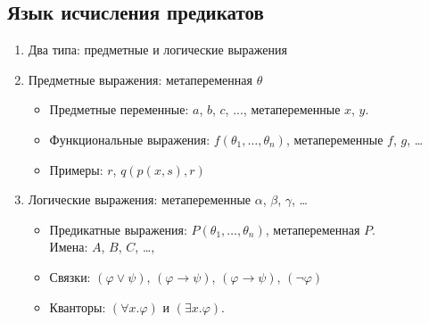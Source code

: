 \subsection{Язык исчисления предикатов}
\begin{enumerate}
    \item Два типа: предметные и логические выражения
    \item Предметные выражения: метапеременная {\color{blue}$\theta$}
    \begin{itemize}
        \item Предметные переменные: {\color{blue}$a$}, {\color{blue}$b$}, {\color{blue}$c$}, ..., метапеременные {\color{blue}$x$}, {\color{blue}$y$}.
        \item Функциональные выражения: {\color{blue}$f(\theta_1,\dots,\theta_n)$}, метапеременные {\color{blue}$f$}, {\color{blue}$g$}, \ldots
        \item Примеры: {\color{blue}$r$},
        {\color{blue}$q(p(x,s),r)$}
    \end{itemize}
    \item Логические выражения: метапеременные {\color{blue}$\alpha$}, {\color{blue}$\beta$}, {\color{blue}$\gamma$}, \ldots
    \begin{itemize}
        \item Предикатные выражения: {\color{blue}$P(\theta_1,\dots,\theta_n)$}, метапеременная {\color{blue}$P$}.\\
        Имена: {\color{blue}$A$}, {\color{blue}$B$}, {\color{blue}$C$}, \ldots,
        \item Связки: {\color{blue}$(\varphi\vee\psi)$}, {\color{blue}$(\varphi\to\psi)$}, {\color{blue}$(\varphi\rightarrow\psi)$},
        {\color{blue}$(\neg\varphi)$}
        \item Кванторы: {\color{blue}$(\forall x.\varphi)$} и {\color{blue}$(\exists x.\varphi)$}.
    \end{itemize}
\end{enumerate}

